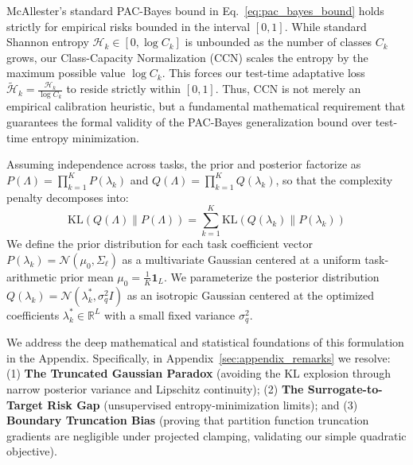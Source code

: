 \begin{remark}
McAllester's standard PAC-Bayes bound in Eq.~\ref{eq:pac_bayes_bound} holds
strictly for empirical risks bounded in the interval $[0, 1]$. While standard
Shannon entropy $\mathcal{H}_k \in [0, \log C_k]$ is unbounded as the number of
classes $C_k$ grows, our Class-Capacity Normalization (CCN) scales the entropy
by the maximum possible value $\log C_k$. This forces our test-time adaptative
loss $\tilde{\mathcal{H}}_k = \frac{\mathcal{H}_k}{\log C_k}$ to reside strictly
within $[0, 1]$. Thus, CCN is not merely an empirical calibration heuristic, but
a fundamental mathematical requirement that guarantees the formal validity of
the PAC-Bayes generalization bound over test-time entropy minimization.
\end{remark}

Assuming independence across tasks, the prior and posterior factorize as
$P(\Lambda) = \prod_{k=1}^K P(\lambda_k)$ and $Q(\Lambda) = \prod_{k=1}^K
Q(\lambda_k)$, so that the complexity penalty decomposes into:
\begin{equation}
\text{KL}(Q(\Lambda) \| P(\Lambda)) = \sum_{k=1}^K \text{KL}(Q(\lambda_k) \| P(\lambda_k))
\label{eq:kl_decomposition}
\end{equation}
We define the prior distribution for each task coefficient vector $P(\lambda_k)
= \mathcal{N}(\mu_0, \Sigma_{\ell})$ as a multivariate Gaussian centered at a
uniform task-arithmetic prior mean $\mu_0 = \frac{1}{K} \mathbf{1}_L$. We
parameterize the posterior distribution $Q(\lambda_k) = \mathcal{N}(\lambda_k^*,
\sigma_q^2 I)$ as an isotropic Gaussian centered at the optimized coefficients
$\lambda_k^* \in \mathbb{R}^L$ with a small fixed variance $\sigma_q^2$.

We address the deep mathematical and statistical foundations of this formulation
in the Appendix. Specifically, in Appendix~\ref{sec:appendix_remarks} we
resolve: (1) \textbf{The Truncated Gaussian Paradox} (avoiding the KL explosion
through narrow posterior variance and Lipschitz continuity); (2) \textbf{The
Surrogate-to-Target Risk Gap} (unsupervised entropy-minimization limits); and
(3) \textbf{Boundary Truncation Bias} (proving that partition function
truncation gradients are negligible under projected clamping, validating our
simple quadratic objective).


